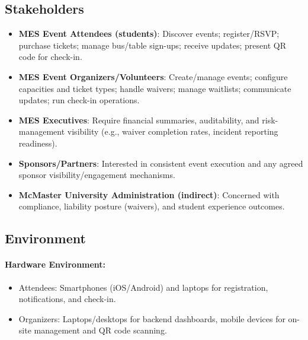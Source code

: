 \documentclass{article}
\begin{document}
\subsection{Stakeholders}
\begin{itemize}
    \item \textbf{MES Event Attendees (students)}: Discover events; register/RSVP; purchase tickets; manage bus/table sign-ups; receive updates; present QR code for check-in.
    \item \textbf{MES Event Organizers/Volunteers}: Create/manage events; configure capacities and ticket types; handle waivers; manage waitlists; communicate updates; run check-in operations.
    \item \textbf{MES Executives}: Require financial summaries, auditability, and risk-management visibility (e.g., waiver completion rates, incident reporting readiness).
    \item \textbf{Sponsors/Partners}: Interested in consistent event execution and any agreed sponsor visibility/engagement mechanisms.
    \item \textbf{McMaster University Administration (indirect)}: Concerned with compliance, liability posture (waivers), and student experience outcomes.
\end{itemize}

\subsection{Environment}
\paragraph{Hardware Environment:}
\begin{itemize}
    \item Attendees: Smartphones (iOS/Android) and laptops for registration, notifications, and check-in.
    \item Organizers: Laptops/desktops for backend dashboards, mobile devices for on-site management and QR code scanning.
\end{itemize}
\end{document}
